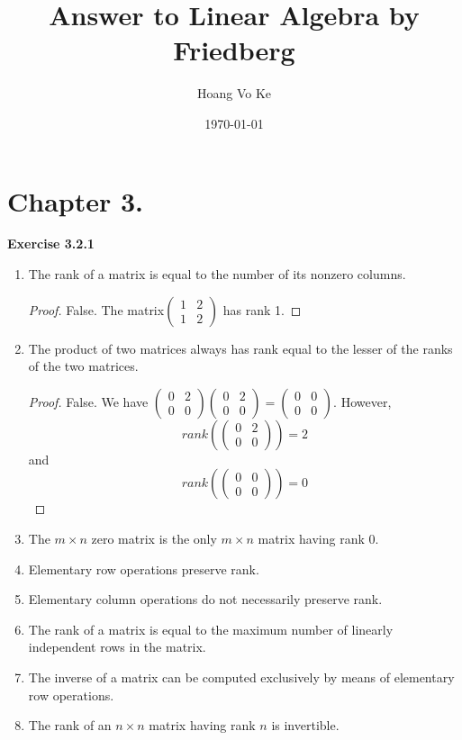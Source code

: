 \documentclass[12pt, a4paper]{article}
\title{Answer to Linear Algebra by Friedberg}
\author{Hoang Vo Ke}
\date{\today}
\theoremstyle{plain}
\newenvironment{exercise}[2][Exercise]
    { \begin{mdframed}[backgroundcolor=gray!20] \textbf{#1 #2} \\}
    {  \end{mdframed}}
\begin{document}
\maketitle

\section*{Chapter 3.}
\begin{exercise}{3.2.1}
\hfill
	\begin{enumerate}[label=(\alph*)]
	\item The rank of a matrix is equal to the number of its nonzero columns.
		\begin{proof}
		False. The matrix$\begin{pmatrix}
		1&2\\
		1&2
		\end{pmatrix}$ has rank 1.
		\end{proof}
	\item The product of two matrices always has rank equal to the lesser of the ranks of the two matrices.
		\begin{proof}
		False. We have $\begin{pmatrix}
		0&2\\
		0&0
		\end{pmatrix}\begin{pmatrix}
		0&2\\
		0&0
		\end{pmatrix}=\begin{pmatrix}
		0&0\\
		0&0
		\end{pmatrix}$. However, $$rank\left(\begin{pmatrix}
		0&2\\
		0&0
		\end{pmatrix}\right)=2$$ and $$rank\left(\begin{pmatrix}
		0&0\\
		0&0
		\end{pmatrix}\right)=0$$
		\end{proof}
	\item The $m\times n$ zero matrix is the only $m\times n$ matrix having rank $0$.
	\item Elementary row operations preserve rank.
	\item Elementary column operations do not necessarily preserve rank.
	\item The rank of a matrix is equal to the maximum number of linearly independent rows in the matrix.
	\item The inverse of a matrix can be computed exclusively by means of elementary row operations.
	\item The rank of an $n\times n$ matrix having rank $n$ is invertible.
	\end{enumerate}
\end{exercise}
\end{document}
